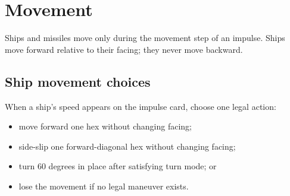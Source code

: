 \chapter{Movement}

Ships and missiles move only during the movement step of an impulse. Ships move forward relative to their facing; they never move backward.

\section{Ship movement choices}

When a ship's speed appears on the impulse card, choose one legal action:

\begin{itemize}
  \item move forward one hex without changing facing;
  \item side-slip one forward-diagonal hex without changing facing;
  \item turn 60 degrees in place after satisfying turn mode; or
  \item lose the movement if no legal maneuver exists.
\end{itemize}

